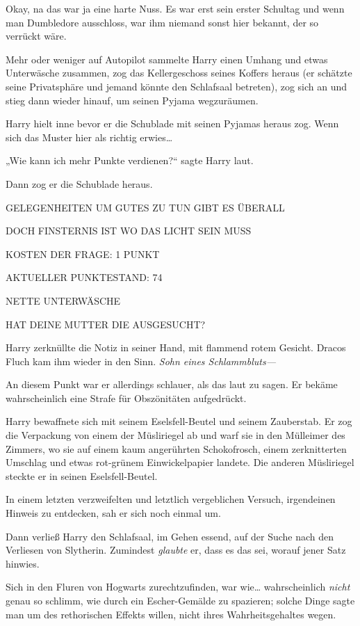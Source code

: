 {Okay, na das war ja eine harte Nuss. Es war erst sein erster Schultag und wenn man Dumbledore ausschloss, war ihm niemand sonst hier bekannt, der so verrückt wäre.

Mehr oder weniger auf Autopilot sammelte Harry einen Umhang und etwas Unterwäsche zusammen, zog das Kellergeschoss seines Koffers heraus (er schätzte seine Privatsphäre und jemand könnte den Schlafsaal betreten), zog sich an und stieg dann wieder hinauf, um seinen Pyjama wegzuräumen.

Harry hielt inne bevor er die Schublade mit seinen Pyjamas heraus zog. Wenn sich das Muster hier als richtig erwies…

„Wie kann ich mehr Punkte verdienen?“ sagte Harry laut.

Dann zog er die Schublade heraus.

GELEGENHEITEN UM GUTES ZU TUN GIBT ES ÜBERALL

DOCH FINSTERNIS IST WO DAS LICHT SEIN MUSS

KOSTEN DER FRAGE: 1 PUNKT

AKTUELLER PUNKTESTAND: 74

NETTE UNTERWÄSCHE

HAT DEINE MUTTER DIE AUSGESUCHT?

Harry zerknüllte die Notiz in seiner Hand, mit flammend rotem Gesicht. Dracos Fluch kam ihm wieder in den Sinn. \emph{Sohn eines Schlammbluts—}

An diesem Punkt war er allerdings schlauer, als das laut zu sagen. Er bekäme wahrscheinlich eine Strafe für Obszönitäten aufgedrückt.

Harry bewaffnete sich mit seinem Eselsfell-Beutel und seinem Zauberstab. Er zog die Verpackung von einem der Müsliriegel ab und warf sie in den Mülleimer des Zimmers, wo sie auf einem kaum angerührten Schokofrosch, einem zerknitterten Umschlag und etwas rot-grünem Einwickelpapier landete. Die anderen Müsliriegel steckte er in seinen Eselsfell-Beutel.

In einem letzten verzweifelten und letztlich vergeblichen Versuch, irgendeinen Hinweis zu entdecken, sah er sich noch einmal um.

Dann verließ Harry den Schlafsaal, im Gehen essend, auf der Suche nach den Verliesen von Slytherin. Zumindest \emph{glaubte} er, dass es das sei, worauf jener Satz hinwies.

Sich in den Fluren von Hogwarts zurechtzufinden, war wie… wahrscheinlich \emph{nicht} genau so schlimm, wie durch ein Escher-Gemälde zu spazieren; solche Dinge sagte man um des rethorischen Effekts willen, nicht ihres Wahrheitsgehaltes wegen.

}
